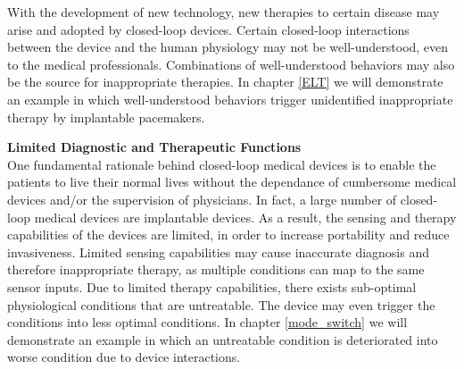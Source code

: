 With the development of new technology, new therapies to certain disease may arise and adopted by closed-loop devices. Certain closed-loop interactions between the device and the human physiology may not be well-understood, even to the medical professionals. Combinations of well-understood behaviors may also be the source for inappropriate therapies. In chapter \ref{ELT} we will demonstrate an example in which well-understood behaviors trigger unidentified inappropriate therapy by implantable pacemakers.

\textbf{Limited Diagnostic and Therapeutic Functions}\\
One fundamental rationale behind closed-loop medical devices is to enable the patients to live their normal lives without the dependance of cumbersome medical devices and/or the supervision of physicians. In fact, a large number of closed-loop medical devices are implantable devices. As a result, the sensing and therapy capabilities of the devices are limited, in order to increase portability and reduce invasiveness. Limited sensing capabilities may cause inaccurate diagnosis and therefore inappropriate therapy, as multiple conditions can map to the same sensor inputs. Due to limited therapy capabilities, there exists sub-optimal physiological conditions that are untreatable. The device may even trigger the conditions into less optimal conditions. In chapter \ref{mode_switch} we will demonstrate an example in which an untreatable condition is deteriorated into worse condition due to device interactions.

